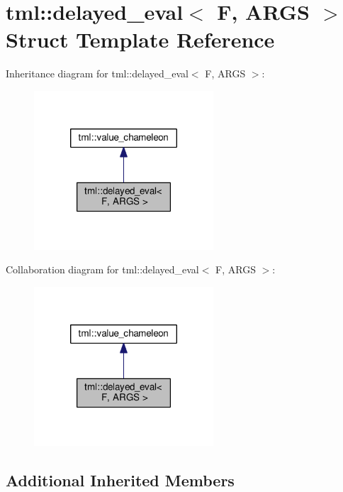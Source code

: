 \hypertarget{structtml_1_1delayed__eval}{\section{tml\+:\+:delayed\+\_\+eval$<$ F, A\+R\+G\+S $>$ Struct Template Reference}
\label{structtml_1_1delayed__eval}
}


Inheritance diagram for tml\+:\+:delayed\+\_\+eval$<$ F, A\+R\+G\+S $>$\+:
\nopagebreak
\begin{figure}[H]
\begin{center}
\leavevmode
\includegraphics[width=190pt]{structtml_1_1delayed__eval__inherit__graph}
\end{center}
\end{figure}


Collaboration diagram for tml\+:\+:delayed\+\_\+eval$<$ F, A\+R\+G\+S $>$\+:
\nopagebreak
\begin{figure}[H]
\begin{center}
\leavevmode
\includegraphics[width=190pt]{structtml_1_1delayed__eval__coll__graph}
\end{center}
\end{figure}
\subsection*{Additional Inherited Members}


